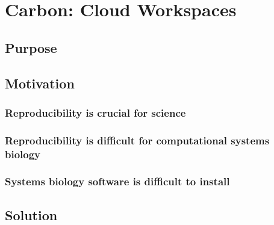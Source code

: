 \chapter{Carbon: Cloud Workspaces}

\section{Purpose}


\section{Motivation}
\subsection{Reproducibility is crucial for science}
\subsection{Reproducibility is difficult for computational systems biology}
\subsection{Systems biology software is difficult to install}


\section{Solution}
